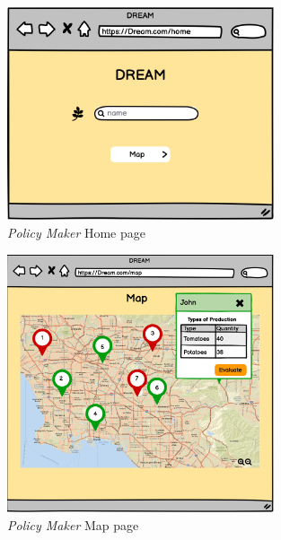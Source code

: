 \begin{figure}[H]
    \begin{center}
    \includegraphics[width=0.7\textwidth]{mocups/PMHome.png}
    \caption{\emph{Policy Maker} Home page}
    \label{fig:PMhomepage}
    \end{center}
\end{figure}

\begin{figure}[H]
    \begin{center}
    \includegraphics[width=0.7\textwidth]{mocups/PMMap.png}
    \caption{\emph{Policy Maker} Map page}
    \label{fig:PMmap}
    \end{center}
\end{figure}


